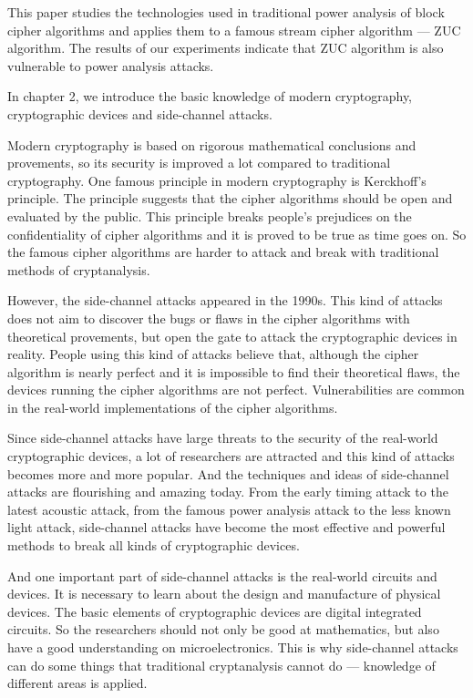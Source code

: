 \begin{bigabstract} %
This paper studies the technologies used in traditional power analysis of block cipher algorithms and applies them to a famous stream cipher algorithm --- ZUC algorithm. The results of our experiments indicate that ZUC algorithm is also vulnerable to power analysis attacks.

In chapter 2, we introduce the basic knowledge of modern cryptography, cryptographic devices and side-channel attacks. 

Modern cryptography is based on rigorous mathematical conclusions and provements, so its security is improved a lot compared to traditional cryptography. One famous principle in modern cryptography is Kerckhoff's principle. The principle suggests that the cipher algorithms should be open and evaluated by the public. This principle breaks people's prejudices on the confidentiality of cipher algorithms and it is proved to be true as time goes on. So the famous cipher algorithms are harder to attack and break with traditional methods of cryptanalysis.

However, the side-channel attacks appeared in the 1990s. This kind of attacks does not aim to discover the bugs or flaws in the cipher algorithms with theoretical provements, but open the gate to attack the cryptographic devices in reality. People using this kind of attacks believe that, although the cipher algorithm is nearly perfect and it is impossible to find their theoretical flaws, the devices running the cipher algorithms are not perfect. Vulnerabilities are common in the real-world implementations of the cipher algorithms.

Since side-channel attacks have large threats to the security of the real-world cryptographic devices, a lot of researchers are attracted and this kind of attacks becomes more and more popular. And the techniques and ideas of side-channel attacks are flourishing and amazing today. From the early timing attack to the latest acoustic attack, from the famous power analysis attack to the less known light attack, side-channel attacks have become the most effective and powerful methods to break all kinds of cryptographic devices.

And one important part of side-channel attacks is the real-world circuits and devices. It is necessary to learn about the design and manufacture of physical devices. The basic elements of cryptographic devices are digital integrated circuits. So the researchers should not only be good at mathematics, but also have a good understanding on microelectronics. This is why side-channel attacks can do some things that traditional cryptanalysis cannot do --- knowledge of different areas is applied.


\end{bigabstract}
